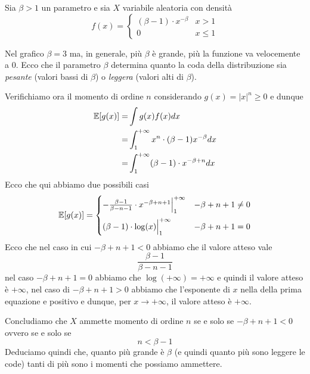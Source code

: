 \begin{example}
	Sia $\beta > 1$ un parametro e sia $X$ variabile aleatoria con densità
	\[
		f(x) = \begin{cases}
			(\beta - 1) \cdot x^{-\beta} & x > 1    \\
			0                            & x \leq 1
		\end{cases}
	\]
	\begin{center}
	\end{center}
	Nel grafico $\beta = 3$ ma, in generale, più $\beta$ è grande, più la funzione va velocemente
	a 0. Ecco che il parametro $\beta$ determina quanto la coda della distribuzione sia
	\emph{pesante} (valori bassi di $\beta$) o \emph{leggera} (valori alti di $\beta$).

	Verifichiamo ora il momento di ordine $n$ considerando $g(x) = |x|^n \geq 0$ e dunque
	\begin{align*}
		\mathbb{E}[g(x)] = & \int g(x) f(x) dx                                    \\
		=          & \int_1^{+\infty} x^n \cdot (\beta - 1) x^{-\beta} dx \\
		=          & \int_{1}^{+\infty} (\beta-1) \cdot x^{-\beta+n} dx
	\end{align*}
	Ecco che qui abbiamo due possibili casi
	\[
		\mathbb{E}[g(x)] = \begin{cases}
			-\frac{\beta-1}{\beta-n-1} \cdot x^{-\beta+n+1} \Big|_1^{+\infty}
			                                          & -\beta+n+1 \neq 0 \\[2ex]
			(\beta-1) \cdot \log(x) \Big|_1^{+\infty} & -\beta+n+1=0
		\end{cases}
	\]
	Ecco che nel caso in cui $-\beta+n+1 < 0$ abbiamo che il valore atteso vale
	\[ \frac{\beta-1}{\beta-n-1} \]
	nel caso $-\beta+n+1 = 0$ abbiamo che $\log(+\infty) = +\infty$ e quindi il valore atteso è
	$+\infty$, nel caso di $-\beta+n+1 > 0$ abbiamo che l'esponente di $x$ nella della prima
	equazione e positivo e dunque, per $x \to +\infty$, il valore atteso è $+\infty$.

	Concludiamo che $X$ ammette momento di ordine $n$ se e solo se $-\beta+n+1 < 0$ ovvero se e
	solo se
	\[ n < \beta - 1 \]
	Deduciamo quindi che, quanto più grande è $\beta$ (e quindi quanto più sono leggere le code)
	tanti di più sono i momenti che possiamo ammettere.
\end{example}

